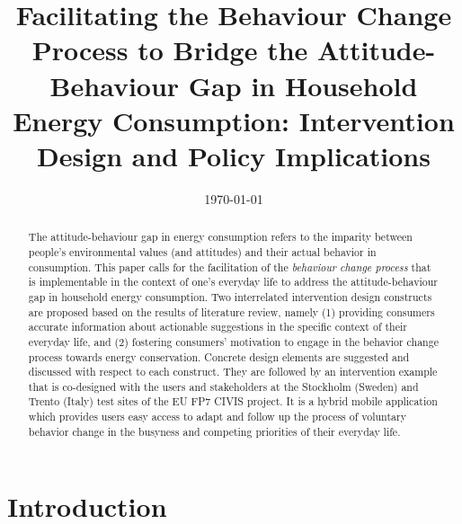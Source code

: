 \documentclass[a4paper,10pt]{article}
\title{
Facilitating the Behaviour Change Process to Bridge the Attitude-Behaviour Gap in Household Energy Consumption: Intervention Design and Policy Implications}
\date{\small{\today}}
\begin{document}
\maketitle

\begin{abstract}
The attitude-behaviour gap in energy consumption refers to the imparity between people's environmental values (and attitudes) and their actual behavior in consumption. This paper calls for the facilitation of the \textit{behaviour change process} that is implementable in the context of one's everyday life to address the attitude-behaviour gap in household energy consumption. Two interrelated intervention design constructs are proposed based on the results of literature review, namely (1) providing consumers accurate information about actionable suggestions in the specific context of their everyday life, and (2) fostering consumers' motivation to engage in the behavior change process towards energy conservation. Concrete design elements are suggested and discussed with respect to each construct. They are followed by an intervention example that is co-designed with the users and stakeholders at the Stockholm (Sweden) and Trento (Italy) test sites of the EU FP7 CIVIS project. It is a hybrid mobile application which provides users easy access to adapt and follow up the process of voluntary behavior change in the busyness and competing priorities of their everyday life. 
\end{abstract}

\section{Introduction}
\label{sec:intro}
\end{document}
